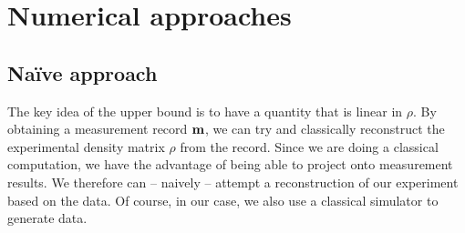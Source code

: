 %
%
%
%
%
%

\section{Numerical approaches}\label{sec:upperbound-numerics}

\subsection{Na\"ive approach}\label{sec:naive-approach}
The key idea of the upper bound is to have a quantity that is linear in $\rho$.
By obtaining a measurement record $\vb{m}$, we can try and classically
reconstruct the experimental density matrix $\rho$ from the record. Since we
are doing a classical computation, we have the advantage of being able to
project onto measurement results. We therefore can -- naively -- attempt a
reconstruction of our experiment based on the data. Of course, in our case, we
also use a classical simulator to generate data.

